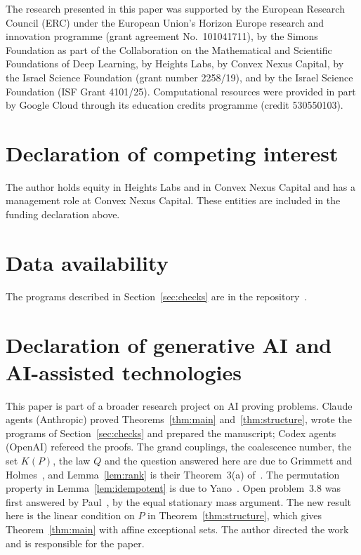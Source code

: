 \documentclass[11pt]{amsart}
\theoremstyle{remark}
\begin{document}
The research presented in this paper was supported by the European Research Council (ERC) under the European Union's
Horizon Europe research and innovation programme (grant agreement No.~101041711), by the Simons Foundation as part of
the Collaboration on the Mathematical and Scientific Foundations of Deep Learning, by Heights Labs, by Convex Nexus
Capital, by the Israel Science Foundation (grant number 2258/19), and by the Israel Science Foundation (ISF Grant
4101/25). Computational resources were provided in part by Google Cloud through its education credits programme
(credit 530550103).

\section*{Declaration of competing interest}
The author holds equity in Heights Labs and in Convex Nexus Capital and has a management role at Convex Nexus Capital.
These entities are included in the funding declaration above.

\section*{Data availability}
The programs described in Section~\ref{sec:checks} are in the repository~\cite{Repo}.

\section*{Declaration of generative AI and AI-assisted technologies}
This paper is part of a broader research project on AI proving problems. Claude agents (Anthropic) proved
Theorems~\ref{thm:main} and~\ref{thm:structure}, wrote the programs of Section~\ref{sec:checks} and prepared the
manuscript; Codex agents (OpenAI) refereed the proofs. The grand couplings, the coalescence number, the set $K(P)$, the
law $Q$ and the question answered here are due to Grimmett and Holmes~\cite{GH21,GH26}, and Lemma~\ref{lem:rank} is
their Theorem~3(a) of~\cite{GH21}. The permutation property in Lemma~\ref{lem:idempotent} is due to Yano~\cite{Yan13}.
Open problem~3.8 was first answered by Paul~\cite{Pau26}, by the equal stationary mass argument. The new result
here is the linear condition on $P$ in Theorem~\ref{thm:structure}, which gives Theorem~\ref{thm:main} with affine
exceptional sets. The author
directed the work
and is responsible for the paper.
\end{document}
